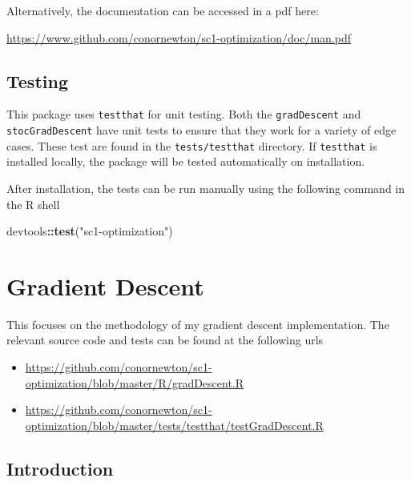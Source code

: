 \documentclass[12pt,]{article}
\newenvironment{Shaded}{\begin{snugshade}}{\end{snugshade}}
\newcommand{\KeywordTok}[1]{\textcolor[rgb]{0.13,0.29,0.53}{\textbf{#1}}}
\newcommand{\NormalTok}[1]{#1}
\newcommand{\OperatorTok}[1]{\textcolor[rgb]{0.81,0.36,0.00}{\textbf{#1}}}
\newcommand{\StringTok}[1]{\textcolor[rgb]{0.31,0.60,0.02}{#1}}
\providecommand{\tightlist}{%
  \setlength{\itemsep}{0pt}\setlength{\parskip}{0pt}}
\begin{document}
Alternatively, the documentation can be accessed in a pdf here:

\url{https://www.github.com/conornewton/sc1-optimization/doc/man.pdf}

\hypertarget{testing}{%
\subsection{Testing}\label{testing}}

This package uses \texttt{testthat} for unit testing. Both the
\texttt{gradDescent} and \texttt{stocGradDescent} have unit tests to
ensure that they work for a variety of edge cases. These test are found
in the \texttt{tests/testthat} directory. If \texttt{testthat} is
installed locally, the package will be tested automatically on
installation.

After installation, the tests can be run manually using the following
command in the R shell

\begin{Shaded}
\begin{Highlighting}[]
\NormalTok{    devtools}\OperatorTok{::}\KeywordTok{test}\NormalTok{(}\StringTok{"sc1-optimization"}\NormalTok{)}
\end{Highlighting}
\end{Shaded}

\newpage

\hypertarget{gradient-descent}{%
\section{Gradient Descent}\label{gradient-descent}}

This focuses on the methodology of my gradient descent implementation.
The relevant source code and tests can be found at the following urls

\begin{itemize}
\tightlist
\item
  \url{https://github.com/conornewton/sc1-optimization/blob/master/R/gradDescent.R}
\item
  \url{https://github.com/conornewton/sc1-optimization/blob/master/tests/testthat/testGradDescent.R}
\end{itemize}

\hypertarget{introduction}{%
\subsection{Introduction}\label{introduction}}
\end{document}
